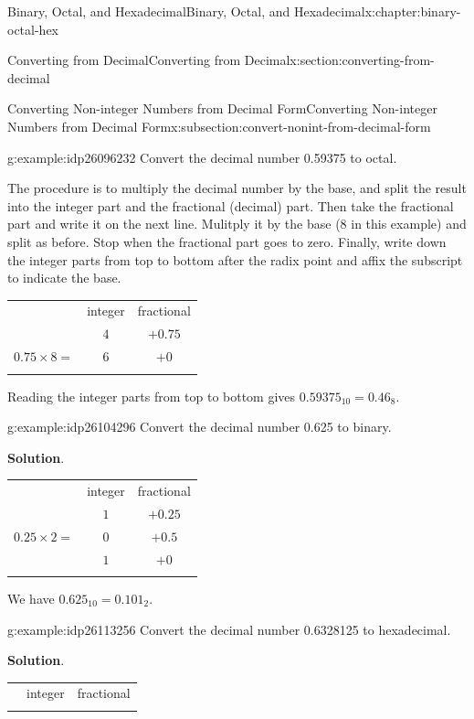 \documentclass[twoside,10pt,]{book}
\newcommand{\blocktitlefont}{\relax}
\newcommand{\tabularfont}{\relax}
\numberwithin{equation}{section}
\newcommand{\hrulemedium}{\noalign{\hrule height 0.07em}}
\newcommand{\hrulethick} {\noalign{\hrule height 0.11em}}
\begin{document}
\begin{chapterptx}{Binary, Octal, and Hexadecimal}{}{Binary, Octal, and Hexadecimal}{}{}{x:chapter:binary-octal-hex}
\begin{sectionptx}{Converting from Decimal}{}{Converting from Decimal}{}{}{x:section:converting-from-decimal}
\begin{subsectionptx}{Converting Non-integer Numbers from Decimal Form}{}{Converting Non-integer Numbers from Decimal Form}{}{}{x:subsection:convert-nonint-from-decimal-form}
\begin{example}{}{g:example:idp26096232}%
Convert the decimal number 0.59375 to octal.%
\par
The procedure is to multiply the decimal number by the base, and split the result into the integer part and the fractional (decimal) part.  Then take the fractional part and write it on the next line.  Mulitply it by the base (8 in this example) and split as before.  Stop when the fractional part goes to zero.  Finally, write down the integer parts from top to bottom after the radix point and affix the subscript to indicate the base. \begin{center}%
{\tabularfont%
\begin{tabular}{ccc}\hrulethick
&integer&fractional\tabularnewline\hrulemedium
\multicolumn{1}{r}{\(0.59375\times 8=\)}&\(4\)&\(+0.75\)\tabularnewline[0pt]
\multicolumn{1}{r}{\(0.75\times 8=\)}&\(6\)&\(+0\)\tabularnewline\hrulethick
\end{tabular}
}%
\end{center}%
 Reading the integer parts from top to bottom gives \(0.59375_{10}=0.46_8\).%
\end{example}
\begin{example}{}{g:example:idp26104296}%
Convert the decimal number 0.625 to binary.\par\smallskip%
\noindent\textbf{\blocktitlefont Solution}.\label{g:solution:idp26098280}{}\hypertarget{g:solution:idp26098280}{}\quad{}\begin{center}%
{\tabularfont%
\begin{tabular}{ccc}\hrulethick
&integer&fractional\tabularnewline\hrulemedium
\multicolumn{1}{r}{\(0.625\times 2=\)}&\(1\)&\(+0.25\)\tabularnewline[0pt]
\multicolumn{1}{r}{\(0.25\times 2=\)}&\(0\)&\(+0.5\)\tabularnewline\hrulethick
\multicolumn{1}{r}{\(0.5\times 2=\)}&\(1\)&\(+0\)\tabularnewline\hrulethick
\end{tabular}
}%
\end{center}%
 We have \(0.625_{10}=0.101_2\).\end{example}
\begin{example}{}{g:example:idp26113256}%
Convert the decimal number 0.6328125 to hexadecimal.\par\smallskip%
\noindent\textbf{\blocktitlefont Solution}.\label{g:solution:idp26107880}{}\hypertarget{g:solution:idp26107880}{}\quad{}\begin{center}%
{\tabularfont%
\begin{tabular}{ccc}\hrulethick
&integer&fractional\tabularnewline\hrulemedium

\end{tabular}}
\end{center}
\end{example}
\end{subsectionptx}
\end{sectionptx}
\end{chapterptx}
\end{document}

